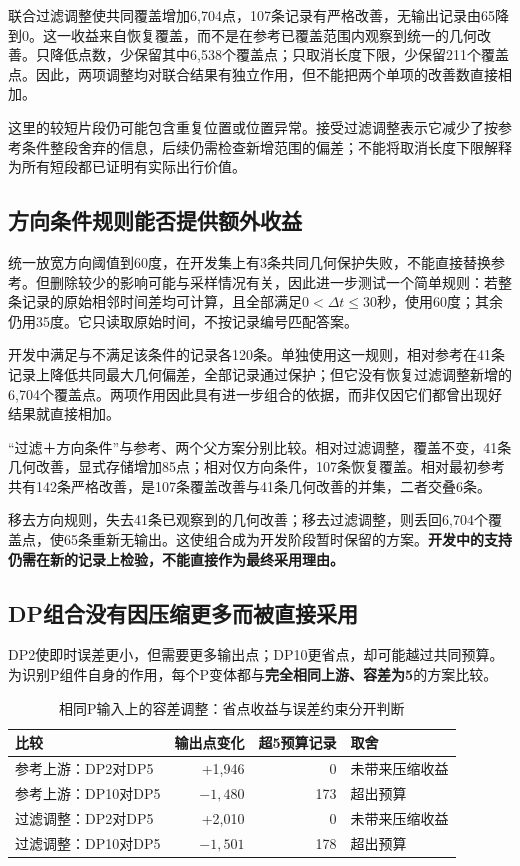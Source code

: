 联合过滤调整使共同覆盖增加6,704点，107条记录有严格改善，无输出记录由65降到0。这一收益来自恢复覆盖，而不是在参考已覆盖范围内观察到统一的几何改善。只降低点数，少保留其中6,538个覆盖点；只取消长度下限，少保留211个覆盖点。因此，两项调整均对联合结果有独立作用，但不能把两个单项的改善数直接相加。

这里的较短片段仍可能包含重复位置或位置异常。接受过滤调整表示它减少了按参考条件整段舍弃的信息，后续仍需检查新增范围的偏差；不能将取消长度下限解释为所有短段都已证明有实际出行价值。

\clearpage
\subsection{方向条件规则能否提供额外收益}
统一放宽方向阈值到60度，在开发集上有3条共同几何保护失败，不能直接替换参考。但删除较少的影响可能与采样情况有关，因此进一步测试一个简单规则：若整条记录的原始相邻时间差均可计算，且全部满足$0<\Delta t\leq30$秒，使用60度；其余仍用35度。它只读取原始时间，不按记录编号匹配答案。

开发中满足与不满足该条件的记录各120条。单独使用这一规则，相对参考在41条记录上降低共同最大几何偏差，全部记录通过保护；但它没有恢复过滤调整新增的6,704个覆盖点。两项作用因此具有进一步组合的依据，而非仅因它们都曾出现好结果就直接相加。

“过滤＋方向条件”与参考、两个父方案分别比较。相对过滤调整，覆盖不变，41条几何改善，显式存储增加85点；相对仅方向条件，107条恢复覆盖。相对最初参考共有142条严格改善，是107条覆盖改善与41条几何改善的并集，二者交叠6条。

移去方向规则，失去41条已观察到的几何改善；移去过滤调整，则丢回6,704个覆盖点，使65条重新无输出。这使组合成为开发阶段暂时保留的方案。\textbf{开发中的支持仍需在新的记录上检验，不能直接作为最终采用理由。}

\subsection{DP组合没有因压缩更多而被直接采用}
DP2使即时误差更小，但需要更多输出点；DP10更省点，却可能越过共同预算。为识别P组件自身的作用，每个P变体都与\textbf{完全相同上游、容差为5}的方案比较。

\begin{table}[htbp]\centering\small
\caption{相同P输入上的容差调整：省点收益与误差约束分开判断}\label{tab:p-combination}
\begin{tabularx}{\linewidth}{@{}YrrY@{}}\toprule
比较 & 输出点变化 & 超5预算记录 & 取舍\\\midrule
参考上游：DP2对DP5 & +1,946 & 0 & 未带来压缩收益\\
参考上游：DP10对DP5 & $-1,480$ & 173 & 超出预算\\
过滤调整：DP2对DP5 & +2,010 & 0 & 未带来压缩收益\\
过滤调整：DP10对DP5 & $-1,501$ & 178 & 超出预算\\\bottomrule
\end{tabularx}
\end{table}

